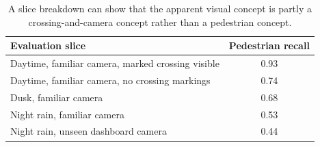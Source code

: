 \begin{table}[t]
\centering
\small
\begin{tabular}{p{6.8cm}c}
\toprule
Evaluation slice & Pedestrian recall \\
\midrule
Daytime, familiar camera, marked crossing visible & 0.93 \\
Daytime, familiar camera, no crossing markings & 0.74 \\
Dusk, familiar camera & 0.68 \\
Night rain, familiar camera & 0.53 \\
Night rain, unseen dashboard camera & 0.44 \\
\bottomrule
\end{tabular}
\caption{A slice breakdown can show that the apparent visual concept is partly a crossing-and-camera concept rather than a pedestrian concept.}
\label{tab:vision-slice-breakdown}
\end{table}

